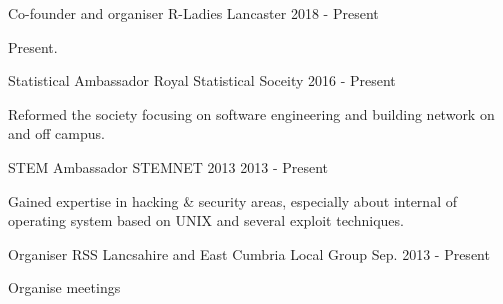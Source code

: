 \begin{cventries}

  \cventry
    {Co-founder and organiser}
    {R-Ladies Lancaster}
    {}
    {2018 - Present}
    {
      \begin{cvitems}
        \item {Present.}
      \end{cvitems}
    }
  \cventry
    {Statistical Ambassador}
    {Royal Statistical Soceity}
    {}
    {2016 - Present}
    {
      \begin{cvitems}
        \item {Reformed the society focusing on software engineering and building network on and off campus.}
      \end{cvitems}
    }
  \cventry
    {STEM Ambassador}
    {STEMNET 2013}
    {}
    {2013 - Present}
    {
      \begin{cvitems}
        \item {Gained expertise in hacking \& security areas, especially about internal of operating system based on UNIX and several exploit techniques.}
      \end{cvitems}
    }
  \cventry
    {Organiser}
    {RSS Lancsahire and East Cumbria Local Group}
    {}
    {Sep. 2013 - Present}
    {
      \begin{cvitems}
        \item {Organise meetings}
      \end{cvitems}
    }
\end{cventries}
